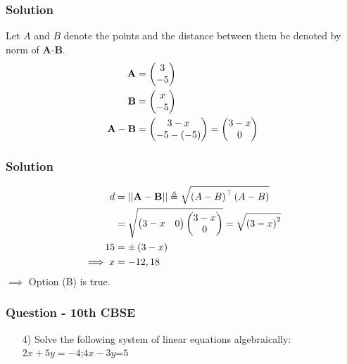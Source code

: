 \documentclass{beamer}
\begin{document}
\begin{frame}
\frametitle{Solution}
Let $A$ and $B$ denote the points and the distance between them be denoted by norm of $\textbf{A}$-$\textbf{B}$.
\begin{align}
\textbf{A} &=
    \begin{pmatrix}
3 \\
-5 
\end{pmatrix}\\
\textbf{B} &=
    \begin{pmatrix}
x \\
-5 
\end{pmatrix}\\
\textbf{A}-\textbf{B} &= \begin{pmatrix}
        3-x\\
        -5 -\left(-5\right)
    \end{pmatrix} = \begin{pmatrix}
        3-x\\
        0
    \end{pmatrix}
    \end{align}
\end{frame}




\begin{frame}
\frametitle{Solution}
\begin{align}
    d &= \lvert\lvert \textbf{A}-\textbf{B} \rvert\rvert \triangleq \sqrt{\left(A-B\right)^\top\left(A-B\right)}\\
&= \sqrt{\begin{pmatrix}
        3-x & 0
    \end{pmatrix}
\begin{pmatrix}
        3-x\\
        0
    \end{pmatrix}}
     = \sqrt{\left(3-x\right)^2}\\
  15 &= \pm\left(3-x\right)\\
 \implies  x &= -12,18
\end{align}
$\implies$ Option (B) is true.
\end{frame}




\begin{frame}
\frametitle{Question - 10th CBSE}
\begin{enumerate}
    \item [4)]
Solve the following system of linear equations algebraically:\\
$2x+5y=-4$;$4x-3y$=$5$
\end{enumerate}
\end{frame}
\end{document}
